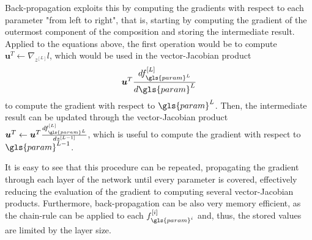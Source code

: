 Back-propagation exploits this by computing the gradients with respect to each parameter "from left to right", that is, starting by computing the gradient of the outermost component of the composition and storing the intermediate result.
Applied to the equations above, the first operation would be to compute $\bm{u}^T\gets\nabla_{z^{[L]}} l$, which would be used in the vector-Jacobian product \[
    \bm{u}^T \frac{d f^{[L]}_{\gls{param}^L}}{d \gls{param}^L}
\] to compute the gradient with respect to $\gls{param}^{L}$.
Then, the intermediate result can be updated through the vector-Jacobian product $\bm{u}^T\gets \bm{u}^T \frac{d f^{[L]}_{\gls{param}^L}}{d z^{[L-1]}}$, which is useful to compute the gradient with respect to $\gls{param}^{L-1}$.

It is easy to see that this procedure can be repeated, propagating the gradient through each layer of the network until every parameter is covered, effectively reducing the evaluation of the gradient to computing several vector-Jacobian products.
Furthermore, back-propagation can be also very memory efficient, as the chain-rule can be applied to each $f^{[i]}_{\gls{param}^i}$ and, thus, the stored values are limited by the layer size\footnotemark.

% 

